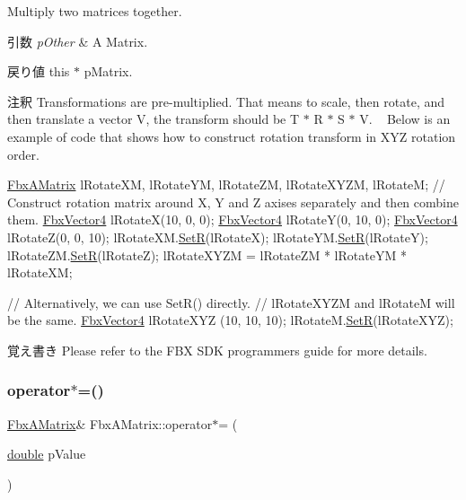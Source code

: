 Multiply two matrices together. 
\begin{DoxyParams}{引数}
{\em p\+Other} & A Matrix. \\
\hline
\end{DoxyParams}
\begin{DoxyReturn}{戻り値}
this $\ast$ p\+Matrix. 
\end{DoxyReturn}
\begin{DoxyRemark}{注釈}
Transformations are pre-\/multiplied. That means to scale, then rotate, and then translate a vector V, the transform should be T $\ast$ R $\ast$ S $\ast$ V. ~\newline
 Below is an example of code that shows how to construct rotation transform in X\+YZ rotation order. 
\begin{DoxyCode}
\hyperlink{class_fbx_a_matrix}{FbxAMatrix} lRotateXM, lRotateYM, lRotateZM, lRotateXYZM, lRotateM;
\textcolor{comment}{// Construct rotation matrix around X, Y and Z axises separately and then combine them.}
\hyperlink{class_fbx_vector4}{FbxVector4} lRotateX(10, 0, 0);
\hyperlink{class_fbx_vector4}{FbxVector4} lRotateY(0, 10, 0);
\hyperlink{class_fbx_vector4}{FbxVector4} lRotateZ(0, 0, 10);
lRotateXM.\hyperlink{class_fbx_a_matrix_ad749080abe63a56225df153dab876c1f}{SetR}(lRotateX);
lRotateYM.\hyperlink{class_fbx_a_matrix_ad749080abe63a56225df153dab876c1f}{SetR}(lRotateY);
lRotateZM.\hyperlink{class_fbx_a_matrix_ad749080abe63a56225df153dab876c1f}{SetR}(lRotateZ);
lRotateXYZM = lRotateZM * lRotateYM * lRotateXM;

\textcolor{comment}{// Alternatively, we can use SetR() directly.}
\textcolor{comment}{// lRotateXYZM and lRotateM will be the same.}
\hyperlink{class_fbx_vector4}{FbxVector4} lRotateXYZ (10, 10, 10);
lRotateM.\hyperlink{class_fbx_a_matrix_ad749080abe63a56225df153dab876c1f}{SetR}(lRotateXYZ);
\end{DoxyCode}
 
\end{DoxyRemark}
\begin{DoxyNote}{覚え書き}
Please refer to the F\+BX S\+DK programmers guide for more details. 
\end{DoxyNote}
\mbox{\label{class_fbx_a_matrix_a0b408712fcb77126c4a8f951ae8a219f}} 
\subsubsection{\texorpdfstring{operator$\ast$=()}{operator*=()}\hspace{0.1cm}{\footnotesize\ttfamily [1/2]}}
{\footnotesize\ttfamily \hyperlink{class_fbx_a_matrix}{Fbx\+A\+Matrix}\& Fbx\+A\+Matrix\+::operator$\ast$= (\begin{DoxyParamCaption}\item[{\hyperlink{class_fbx_a_matrix_ad463edbb9fea344643297701f159faa7}{double}}]{p\+Value }\end{DoxyParamCaption})}

